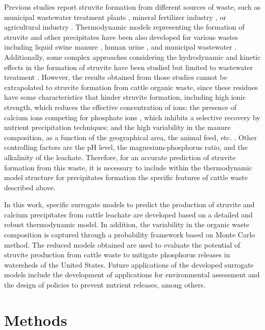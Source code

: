 \begin{refsection}[referencesCh3]
Previous studies report struvite formation from different sources of waste, such as municipal wastewater treatment plants \citep{Battistoni}, mineral fertilizer industry \citep{Matynia}, or agricultural industry \citep{Shashvatt}. Thermodynamic models representing the formation of struvite and other precipitates have been also developed for various wastes including liquid swine manure \citep{celen_using_2007}, human urine \citep{Harada, ronteltap_struvite_2007}, and municipal wastewater \citep{rahaman_modeling_2014}. Additionally, some complex approaches considering the hydrodynamic and kinetic effects in the formation of struvite have been studied but limited to wastewater treatment \citep{rahaman_modeling_2014, mangin2004fluid}. However, the results obtained from those studies cannot be extrapolated to struvite formation from cattle organic waste, since these residues have some characteristics that hinder struvite formation, including high ionic strength, which reduces the effective concentration of ions; the presence of calcium ions competing for phosphate ions \citep{Yan}, which inhibits a selective recovery by nutrient precipitation techniques; and the high variability in the manure composition, as a function of the geographical area, the animal feed, etc. \citep{Tao}. Other controlling factors are the pH level, the magnesium-phosphorus ratio, and the alkalinity of the leachate. Therefore, for an accurate prediction of struvite formation from this waste, it is necessary to include within the thermodynamic model structure for precipitates formation the specific features  of cattle waste described above.

In this work, specific surrogate models to predict the production of struvite and calcium precipitates from cattle leachate are developed based on a detailed and robust thermodynamic model. In addition, the variability in the organic waste composition is captured through a probability framework based on Monte Carlo method. The reduced models obtained are used to evaluate the potential of struvite production from cattle waste to mitigate phosphorus releases in watersheds of the United States. Future applications of the developed surrogate models include the development of applications for environmental assessment and the design of policies to prevent nutrient releases, among others.

\section{Methods}

\end{refsection}
